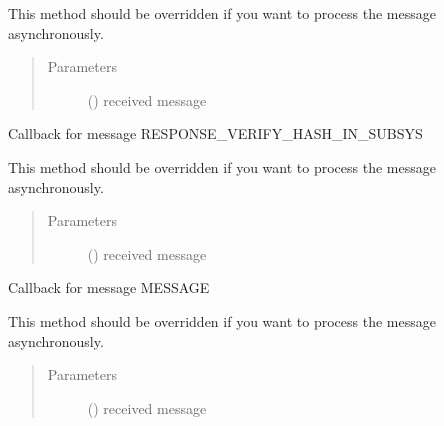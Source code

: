 \documentclass[letterpaper,10pt,english]{sphinxmanual}
\begin{document}
\begin{fulllineitems}
\begin{fulllineitems}
This method should be overridden if you want to process the message asynchronously.
\begin{quote}\begin{description}
\item[{Parameters}] \leavevmode
{} () \textendash{} received message

\end{description}\end{quote}

\end{fulllineitems}


\begin{fulllineitems}
\label{\detokenize{bbc1.core.bbc_app:bbc1.core.bbc_app.Callback.proc_resp_verify_hash}}
Callback for message RESPONSE\_VERIFY\_HASH\_IN\_SUBSYS

This method should be overridden if you want to process the message asynchronously.
\begin{quote}\begin{description}
\item[{Parameters}] \leavevmode
{} () \textendash{} received message

\end{description}\end{quote}

\end{fulllineitems}


\begin{fulllineitems}
\label{\detokenize{bbc1.core.bbc_app:bbc1.core.bbc_app.Callback.proc_user_message}}
Callback for message MESSAGE

This method should be overridden if you want to process the message asynchronously.
\begin{quote}\begin{description}
\item[{Parameters}] \leavevmode
{} () \textendash{} received message


\end{description}
\end{quote}
\end{fulllineitems}
\end{fulllineitems}
\end{document}
